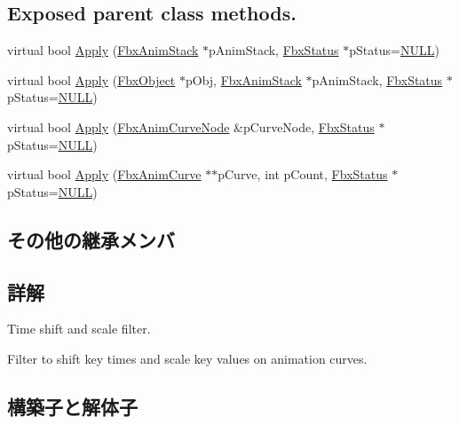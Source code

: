 \subsection*{Exposed parent class methods.}
\begin{DoxyCompactItemize}
\item 
virtual bool \hyperlink{class_fbx_anim_curve_filter_t_s_s_a7c301b85f939c3614d998f18e7a20f21}{Apply} (\hyperlink{class_fbx_anim_stack}{Fbx\+Anim\+Stack} $\ast$p\+Anim\+Stack, \hyperlink{class_fbx_status}{Fbx\+Status} $\ast$p\+Status=\hyperlink{fbxarch_8h_a070d2ce7b6bb7e5c05602aa8c308d0c4}{N\+U\+LL})
\item 
virtual bool \hyperlink{class_fbx_anim_curve_filter_t_s_s_af45ca048d4dbffe6d12cbc42f6e26c10}{Apply} (\hyperlink{class_fbx_object}{Fbx\+Object} $\ast$p\+Obj, \hyperlink{class_fbx_anim_stack}{Fbx\+Anim\+Stack} $\ast$p\+Anim\+Stack, \hyperlink{class_fbx_status}{Fbx\+Status} $\ast$p\+Status=\hyperlink{fbxarch_8h_a070d2ce7b6bb7e5c05602aa8c308d0c4}{N\+U\+LL})
\item 
virtual bool \hyperlink{class_fbx_anim_curve_filter_t_s_s_a9d6e08d720db38d5d795c3993298ada2}{Apply} (\hyperlink{class_fbx_anim_curve_node}{Fbx\+Anim\+Curve\+Node} \&p\+Curve\+Node, \hyperlink{class_fbx_status}{Fbx\+Status} $\ast$p\+Status=\hyperlink{fbxarch_8h_a070d2ce7b6bb7e5c05602aa8c308d0c4}{N\+U\+LL})
\item 
virtual bool \hyperlink{class_fbx_anim_curve_filter_t_s_s_a437251b0d7ead091c273ae49a3e21e5f}{Apply} (\hyperlink{class_fbx_anim_curve}{Fbx\+Anim\+Curve} $\ast$$\ast$p\+Curve, int p\+Count, \hyperlink{class_fbx_status}{Fbx\+Status} $\ast$p\+Status=\hyperlink{fbxarch_8h_a070d2ce7b6bb7e5c05602aa8c308d0c4}{N\+U\+LL})
\end{DoxyCompactItemize}
\subsection*{その他の継承メンバ}


\subsection{詳解}
Time shift and scale filter.

Filter to shift key times and scale key values on animation curves. 

\subsection{構築子と解体子}
\mbox{\label{class_fbx_anim_curve_filter_t_s_s_a31c1875bfeb94aec880e46c449853409}} 
